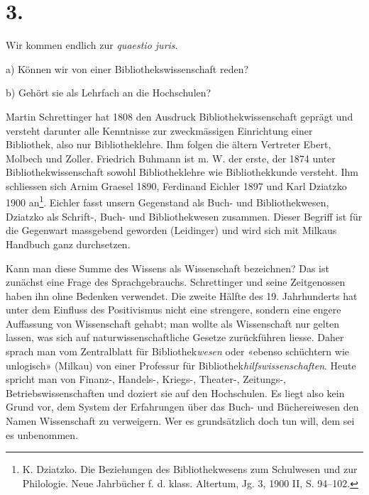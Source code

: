 \documentclass[a4paper,
fontsize=11pt,
oneside,
numbers=noperiodatend,
parskip=half-,
bibliography=totoc,
final
]{scrartcl}
\begin{document}
\hypertarget{section-2}{%
\section{3.}\label{section-2}}

Wir kommen endlich zur \emph{quaestio juris}.

a) Können wir von einer Bibliothekswissenschaft reden?

b) Gehört sie als Lehrfach an die Hochschulen?

Martin Schrettinger hat 1808 den Ausdruck Bibliothekwissenschaft geprägt
und versteht darunter alle Kenntnisse zur zweckmässigen Einrichtung
einer Bibliothek, also nur Bibliotheklehre. Ihm folgen die ältern
Vertreter Ebert, Molbech und Zoller. Friedrich Buhmann ist m. W. der
erste, der 1874 unter Bibliothekwissenschaft sowohl Bibliotheklehre wie
Bibliothekkunde versteht. Ihm schliessen sich Arnim Graesel 1890,
Ferdinand Eichler 1897 und Karl Dziatzko 1900 an\footnote{K. Dziatzko.
  Die Beziehungen des Bibliothekwesens zum Schulwesen und zur
  Philologie. Neue Jahrbücher f. d. klass. Altertum, Jg. 3, 1900 II, S.
  94--102.}. Eichler fasst unsern Gegenstand als Buch- und
Bibliothekwesen, Dziatzko als Schrift-, Buch- und Bibliothekwesen
zusammen. Dieser Begriff ist für die Gegenwart massgebend geworden
(Leidinger) und wird sich mit Milkaus Handbuch ganz durchsetzen.

Kann man diese Summe des Wissens als Wissenschaft bezeichnen? Das ist
zunächst eine Frage des Sprachgebrauchs. Schrettinger und seine
Zeitgenossen haben ihn ohne Bedenken verwendet. Die zweite Hälfte des
19. Jahrhunderts hat unter dem Einfluss des Positivismus nicht eine
strengere, sondern eine engere Auffassung von Wissenschaft gehabt; man
wollte als Wissenschaft nur gelten lassen, was sich auf
naturwissenschaftliche Gesetze zurückführen liesse. Daher sprach man vom
Zentralblatt für Bibliothek\emph{wesen} oder «ebenso schüchtern wie
unlogisch» (Milkau) von einer Professur für
Bibliothek\emph{hilfswissenschaften}. Heute spricht man von Finanz-,
Handels-, Kriegs-, Theater-, Zeitungs-, Betriebswissenschaften und
doziert sie auf den Hochschulen. Es liegt also kein Grund vor, dem
System der Erfahrungen über das Buch- und Büchereiwesen den Namen
Wissenschaft zu verweigern. Wer es grundsätzlich doch tun will, dem sei
es unbenommen.
\end{document}
